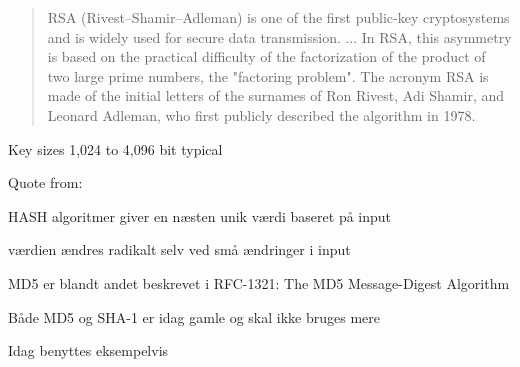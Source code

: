 \documentclass[Screen16to9,17pt]{foils}
\begin{document}

\begin{quote}
RSA (Rivest–Shamir–Adleman) is one of the first public-key cryptosystems and is widely used for secure data transmission. ...
In RSA, this asymmetry is based on the practical difficulty of the factorization of the product of two large prime numbers, the "factoring problem". The acronym RSA is made of the initial letters of the surnames of Ron Rivest, Adi Shamir, and Leonard Adleman, who first publicly described the algorithm in 1978.
\end{quote}

\begin{list2}
\item Key sizes	1,024 to 4,096 bit typical
\item  Quote from: 
\end{list2}



\begin{list1}
\item HASH algoritmer giver en næsten unik værdi baseret på input
\item værdien ændres radikalt selv ved små ændringer i input
\item MD5 er blandt andet beskrevet i RFC-1321: The MD5 Message-Digest
  Algorithm
\item Både MD5 og SHA-1 er idag gamle og skal ikke bruges mere
\item Idag benyttes eksempelvis 
\end{list1}


\end{document}
